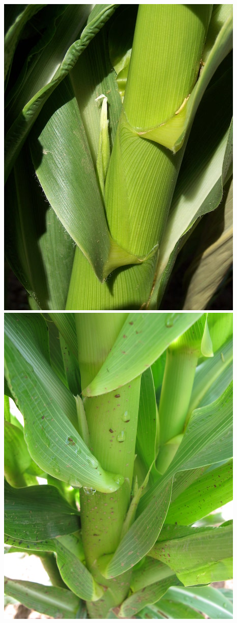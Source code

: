 \documentclass[12pt,]{article}
\begin{document}
\includegraphics{./images/growth/7_silk_development.jpg}
\includegraphics{./images/growth/8_silk_development.jpg}
\end{document}
